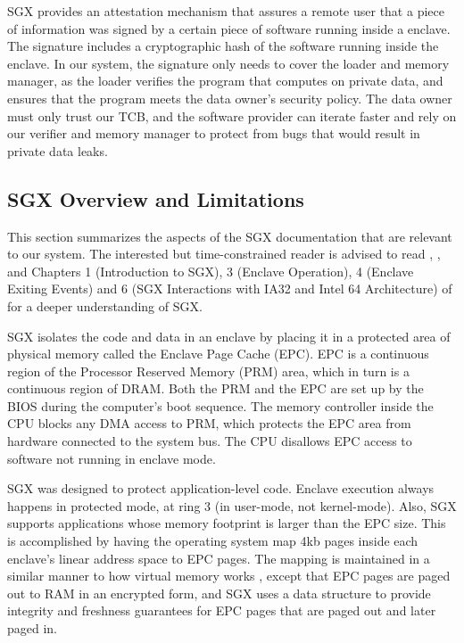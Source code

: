 SGX provides an attestation mechanism that assures a remote user that a piece
of information was signed by a certain piece of software running inside a
enclave. The signature includes a cryptographic hash of the software running
inside the enclave. In our system, the signature only needs to cover the loader
and memory manager, as the loader verifies the program that computes on
private data, and ensures that the program meets the data owner's security
policy. The data owner must only trust our TCB, and the software provider can
iterate faster and rely on our verifier and memory manager to protect from
bugs that would result in private data leaks.

\subsection{SGX Overview and Limitations}

This section summarizes the aspects of the SGX documentation that are relevant
to our system. The interested but time-constrained reader is advised to read
\cite{mckeen2013innovative}, \cite{anati2013sgx}, and Chapters 1 (Introduction
to SGX), 3 (Enclave Operation), 4 (Enclave Exiting Events) and 6 (SGX
Interactions with IA32 and Intel 64 Architecture) of \cite{intel2013sgxmanual}
for a deeper understanding of SGX.

SGX isolates the code and data in an enclave by placing it in a protected area
of physical memory called the Enclave Page Cache (EPC). EPC is a continuous
region of the Processor Reserved Memory (PRM) area, which in turn is a
continuous region of DRAM. Both the PRM and the EPC are set up by the BIOS
during the computer's boot sequence. The memory controller inside the CPU
blocks any DMA access to PRM, which protects the EPC area from hardware
connected to the system bus. The CPU disallows EPC access to software not
running in enclave mode.

SGX was designed to protect application-level code. Enclave execution always
happens in protected mode, at ring 3 (in user-mode, not kernel-mode). Also, SGX
supports applications whose memory footprint is larger than the EPC size. This
is accomplished by having the operating system map 4kb pages inside each
enclave's linear address space to EPC pages. The mapping is maintained in a
similar manner to how virtual memory works \cite{jacob1998virtual}, except that
EPC pages are paged out to RAM in an encrypted form, and SGX uses a data
structure to provide integrity and freshness guarantees for EPC pages that are
paged out and later paged in.

